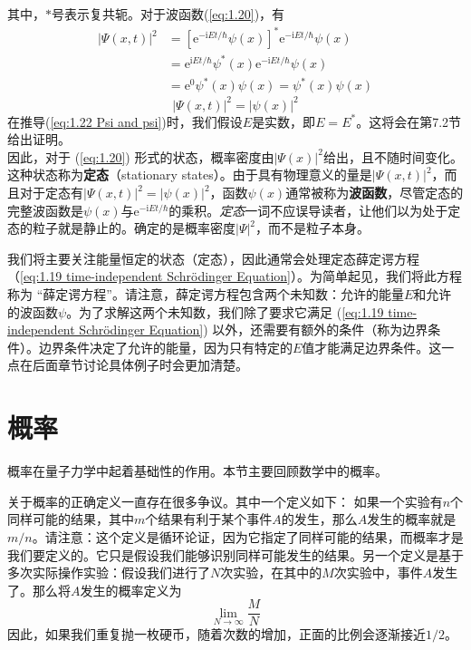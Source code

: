 	其中，$\ast$号表示复共轭。对于波函数(\ref{eq:1.20})，有
	\begin{equation*}
		\begin{aligned}
			\left|\Psi\left(x,t\right)\right|^2 &=\left[\mathrm{e}^{-\mathrm{i}Et/\hbar}\psi\left(x\right)\right]^{\ast}\mathrm{e}^{-\mathrm{i}Et/\hbar}\psi\left(x\right)\\
			& = \mathrm{e}^{\mathrm{i}Et/\hbar}\psi^{\ast}\left(x\right)\mathrm{e}^{-\mathrm{i}Et/\hbar}\psi\left(x\right)\\
			& = \mathrm{e}^0\psi^{\ast}\left(x\right)\psi\left(x\right)=\psi^\ast\left(x\right)\psi\left(x\right)
		\end{aligned}
	\end{equation*}
	\begin{equation}
		\left|\Psi\left(x,t\right)\right|^2=\left|\psi\left(x\right)\right|^2
		\label{eq:1.22 Psi and psi}
	\end{equation}
	在推导(\ref{eq:1.22 Psi and psi})时，我们假设$E$是实数，即$E=E^{\ast}$。这将会在第7.2节给出证明。\\
	\indent 因此，对于 (\ref{eq:1.20}) 形式的状态，概率密度由$\left|\Psi\left(x\right)\right|^2$给出，且不随时间变化。这种状态称为\textbf{定态}（stationary states）。由于具有物理意义的量是$\left|\Psi\left(x,t\right)\right|^2$，而且对于定态有$\left|\Psi\left(x,t\right)\right|^2=\left|\psi\left(x\right)\right|^2$，函数$\psi\left(x\right)$通常被称为\textbf{波函数}，尽管定态的完整波函数是$\psi\left(x\right)$与$\mathrm{e}^{-\mathrm{i}Et/\hbar}$的乘积。\textit{定态}一词不应误导读者，让他们以为处于定态的粒子就是静止的。确定的是概率密度$\left|\Psi\right|^2$，而不是粒子本身。

	我们将主要关注能量恒定的状态（定态），因此通常会处理定态薛定谔方程（\ref{eq:1.19 time-independent Schrödinger Equation}）。为简单起见，我们将此方程称为 “薛定谔方程”。请注意，薛定谔方程包含两个未知数：允许的能量$E$和允许的波函数$ \psi$。为了求解这两个未知数，我们除了要求它满足 (\ref{eq:1.19 time-independent Schrödinger Equation}) 以外，还需要有额外的条件（称为边界条件）。边界条件决定了允许的能量，因为只有特定的$E$值才能满足边界条件。这一点在后面章节讨论具体例子时会更加清楚。
	
	\section{概率}
	\label{sec:1.6 Probability}
	概率在量子力学中起着基础性的作用。本节主要回顾数学中的概率。

	关于概率的正确定义一直存在很多争议。其中一个定义如下： 如果一个实验有$n$个同样可能的结果，其中$m$个结果有利于某个事件$A$的发生，那么$A$发生的概率就是$m/n$。请注意：这个定义是循环论证，因为它指定了同样可能的结果，而概率才是我们要定义的。它只是假设我们能够识别同样可能发生的结果。另一个定义是基于多次实际操作实验：假设我们进行了$N$次实验，在其中的$M$次实验中，事件$A$发生了。那么将$A$发生的概率定义为
	\begin{equation*}
		\lim\limits_{N \to \infty}\frac{M}{N}
	\end{equation*}
	因此，如果我们重复抛一枚硬币，随着次数的增加，正面的比例会逐渐接近$1/2$。

